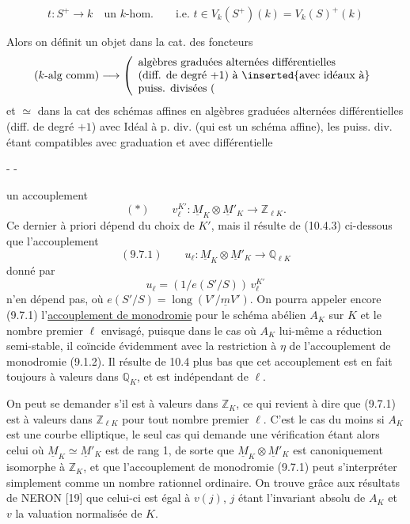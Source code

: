 \[
 t:S^+\longrightarrow k\quad\text{un $k$-hom.}\qquad
\text{i.e. }t\in V_k(S^+)(k)=V_k(S)^+(k)
\]

Alors on définit un objet  dans la cat. des foncteurs
\[
(k\text{-alg comm})\longrightarrow
\left(\begin{array}{l}\text{algèbres graduées alternées différentielles}\\
\text{(diff. de degré $+1$) à}\ \inserted{\text{avec idéaux à}}\\
\text{puiss. divisées (}\end{array}\right.
\]
et $\simeq$ dans la cat des  schémas affines  en algèbres graduées alternées différentielles (diff. de degré $+1$) avec Idéal  à p. div. (qui est un schéma affine), les puiss. div. étant compatibles avec graduation et avec différentielle


\begin{center}-  -\end{center}

un accouplement
\[
(*)\qquad v_\ell^{K'}:\underline M_K\otimes\underline M'_K\longrightarrow\mathbb Z_{\ell K}.
\]
Ce dernier à priori dépend du choix de $K'$, mais il résulte de (10.4.3) ci-dessous que l'accouplement
\[
(9.7.1)\qquad u_\ell:\underline M_K\otimes\underline M'_K\longrightarrow\mathbb Q_{\ell K}
\]
donné par
\[
u_\ell=(1/e(S'/S))\,v_\ell^{K'}
\]
n'en dépend pas, où $e(S'/S)=\operatorname{long}(V'/\underline mV')$. On pourra appeler encore (9.7.1) l'\uline{accouplement de monodromie} pour le schéma abélien $A_K$ sur $K$ et le nombre premier $\ell$ envisagé, puisque dans le cas où $A_K$ lui-même a réduction semi-stable, il coïncide évidemment avec la restriction à $\eta$ de l'accouplement de monodromie (9.1.2). Il résulte de 10.4 plus bas que cet accouplement est en fait toujours à valeurs dans $\mathbb Q_K$, et est indépendant de $\ell$.

On peut se demander s'il est à valeurs dans $\mathbb Z_K$, ce qui revient à dire que (9.7.1) est à valeurs dans $\mathbb Z_{\ell K}$ pour tout nombre premier $\ell$. C'est le cas du moins si $A_K$ est une courbe elliptique, le seul cas qui demande une vérification étant alors celui où $\underline M_K\simeq\underline M'_K$ est de rang 1, de sorte que $\underline M_K\otimes\underline M'_K$ est canoniquement isomorphe à $\mathbb Z_K$, et que l'accouplement de monodromie (9.7.1) peut s'interpréter simplement comme un nombre rationnel ordinaire. On trouve grâce aux résultats de NERON [19] que celui-ci est égal à $v(j)$, $j$ étant l'invariant absolu de $A_K$ et $v$ la valuation normalisée de $K$.

